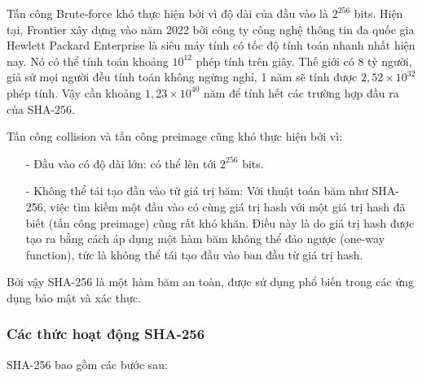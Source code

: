 Tấn công Brute-force khó thực hiện bởi vì độ dài của đầu vào là $2^{256}$ bits.
Hiện tại, Frontier xây dựng vào năm 2022 bởi công ty công nghệ thông tin đa quốc gia
Hewlett Packard Enterprise là siêu máy tính có tốc độ tính toán nhanh nhất hiện nay. Nó có thể tính
toán khoảng $10^{12}$ phép tính trên giây. Thế giới có 8 tỷ người, giả sử mọi người đều tính toán
không ngừng nghỉ, 1 năm sẽ tính được $2,52 \times 10^{32}$ phép tính. Vậy cần khoảng $1,23 \times 10^{40}$ năm để tính hết các 
trường hợp đầu ra của SHA-256. 

Tấn công collision và tấn công preimage cũng khó thực hiện bởi vì:
\begin{itemize}
    \item[-] Đầu vào có độ dài lớn: có thể lên tới $2^{256}$ bits.
    \item[-] Không thể tái tạo đầu vào từ giá trị băm: Với thuật toán băm như SHA-256, 
    việc tìm kiếm một đầu vào có cùng giá trị hash với một giá trị hash đã biết (tấn công preimage) cũng rất khó khăn. Điều này là do giá trị hash được tạo ra bằng cách áp dụng một hàm băm không thể đảo ngược (one-way function), tức là không thể tái tạo đầu vào ban đầu từ giá trị hash.
\end{itemize}

Bởi vậy SHA-256 là một hàm băm an toàn, được sử dụng phổ biến trong các ứng dụng bảo mật và xác thực.

\subsubsection{Các thức hoạt động SHA-256}
SHA-256 bao gồm các bước sau:

